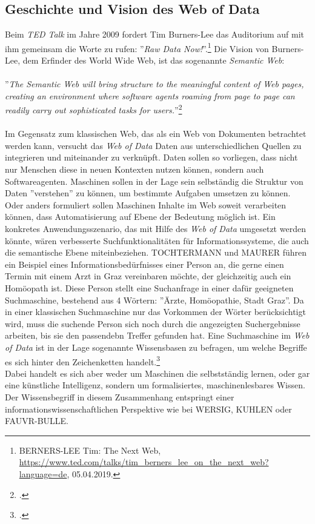 \documentclass[12pt,a4paper]{article}
\begin{document}
\subsection{Geschichte und Vision des Web of Data}


Beim \textit{TED Talk} im Jahre 2009 fordert Tim Burners-Lee das Auditorium auf mit ihm gemeinsam die Worte zu rufen: ''\textit{Raw Data Now!}''.\footnote{BERNERS-LEE Tim: The Next Web, \url{https://www.ted.com/talks/tim_berners_lee_on_the_next_web?language=de}, 05.04.2019.} Die Vision von Burners-Lee, dem Erfinder des World Wide Web, ist das sogenannte \textit{Semantic Web}:
\\
\\
''\textit{The Semantic Web will bring structure to the meaningful content of Web pages, creating an environment where software agents roaming from page to page can readily carry out sophisticated tasks for users.}''\footcite[][S.3]{berners2001semantic}
\\
\\
Im Gegensatz zum klassischen Web, das als ein Web von Dokumenten betrachtet werden kann, versucht das \textit{Web of Data} Daten aus unterschiedlichen Quellen zu integrieren und miteinander zu verknüpft. Daten sollen so vorliegen, dass nicht nur Menschen diese in neuen Kontexten nutzen können, sondern auch Softwareagenten. Maschinen sollen in der Lage sein selbständig die Struktur von Daten ''verstehen'' zu können, um bestimmte Aufgaben umsetzen zu können. Oder anders formuliert sollen Maschinen Inhalte im Web soweit verarbeiten können, dass Automatisierung auf Ebene der Bedeutung möglich ist. Ein konkretes Anwendungsszenario, das mit Hilfe des \textit{Web of Data} umgesetzt werden könnte, wären verbesserte Suchfunktionalitäten für Informationssysteme, die auch die semantische Ebene miteinbeziehen. TOCHTERMANN und MAURER führen ein Beispiel eines Informationsbedürfnisses einer Person an, die gerne einen Termin mit einem Arzt in Graz vereinbaren möchte, der gleichzeitig auch ein Homöopath ist. Diese Person stellt eine Suchanfrage in einer dafür geeigneten Suchmaschine, bestehend aus 4 Wörtern: ''Ärzte, Homöopathie, Stadt Graz''. Da in einer klassischen Suchmaschine nur das Vorkommen der Wörter berücksichtigt wird, muss die suchende Person sich noch durch die angezeigten Suchergebnisse arbeiten, bis sie den passendebn Treffer gefunden hat. Eine Suchmaschine im \textit{Web of Data} ist in der Lage sogenannte Wissensbasen zu befragen, um welche Begriffe es sich hinter den Zeichenketten handelt.\footcite[S.1-2]{pellegrini2006semantic} 
\\
 Dabei handelt es sich aber weder um Maschinen die selbstständig lernen, oder gar eine künstliche Intelligenz, sondern um formalisiertes, maschinenlesbares Wissen. Der Wissensbegriff in diesem Zusammenhang entspringt einer informationswissenschaftlichen Perspektive wie bei WERSIG, KUHLEN oder FAUVR-BULLE.
\end{document}
